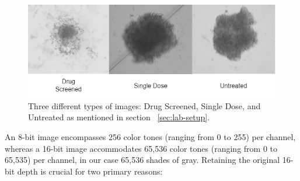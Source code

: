 \documentclass[12pt,twoside,a4paper,parskip]{scrbook} %
\begin{document}
\begin{figure}[H]
  \centering
  \includegraphics[scale=0.6]{figures/originals.png} 
  \caption{Three different types of images: Drug Screened, Single Dose, and Untreated as mentioned in section ~\ref{sec:lab-setup}.}
  \label{fig:originals}
\end{figure}

An 8-bit image encompasses 256 color tones (ranging from 0 to 255) per channel, whereas a 16-bit image accommodates 65,536 color tones (ranging from 0 to 65,535) per channel, in our case 65,536 shades of gray. Retaining the original 16-bit depth is crucial for two primary reasons:
\end{document}
